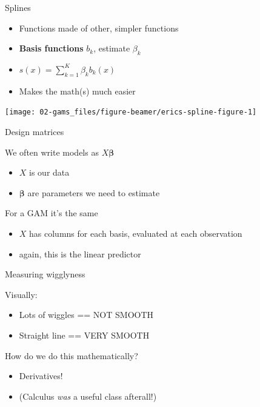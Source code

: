 \documentclass[10pt,ignorenonframetext,compress, aspectratio=169]{beamer}
\providecommand{\tightlist}{%
  \setlength{\itemsep}{0pt}\setlength{\parskip}{0pt}}
\begin{document}
\begin{frame}{Splines}

\begin{itemize}
\tightlist
\item
  Functions made of other, simpler functions
\item
  \textbf{Basis functions} \(b_k\), estimate \(\beta_k\)
\item
  \(s(x) = \sum_{k=1}^K \beta_k b_k(x)\)
\item
  Makes the math(s) much easier
\end{itemize}

\begin{center}\texttt{[image: 02-gams\_files/figure-beamer/erics-spline-figure-1]} \end{center}

\end{frame}

\begin{frame}{Design matrices}

We often write models as \(X\boldsymbol{\beta}\)

\begin{itemize}
\tightlist
\item
  \(X\) is our data
\item
  \(\boldsymbol{\beta}\) are parameters we need to estimate
\end{itemize}

For a GAM it's the same

\begin{itemize}
\tightlist
\item
  \(X\) has columns for each basis, evaluated at each observation
\item
  again, this is the linear predictor
\end{itemize}

\end{frame}

\begin{frame}{Measuring wigglyness}

Visually:

\begin{itemize}
\tightlist
\item
  Lots of wiggles == NOT SMOOTH
\item
  Straight line == VERY SMOOTH
\end{itemize}

How do we do this mathematically?

\begin{itemize}
\tightlist
\item
  Derivatives!
\item
  (Calculus \emph{was} a useful class afterall!)
\end{itemize}

\end{frame}
\end{document}
